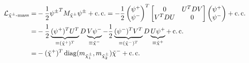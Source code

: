 \documentclass[../main.tex]{subfiles}
\begin{document}
\begin{align}
  \nonumber
  \L_{\tilde\chi^\pm\text{-mass}} = & -\frac{1}{2}{\psi^\pm}^T M_{\tilde\chi^\pm} \psi^\pm + \cc = -\frac{1}{2} \begin{pmatrix}
                                                                                                                  \psi^+ \\ \psi^-
                                                                                                                \end{pmatrix}^T \begin{bmatrix}
                                                                                                                                  0       & U^T D V \\
                                                                                                                                  V^T D U & 0
                                                                                                                                \end{bmatrix} \begin{pmatrix}
                                                                                                                                                \psi^+ \\ \psi^-
                                                                                                                                              \end{pmatrix} + \cc                                                                                                              \\
  \nonumber
  =                                 & -\frac{1}{2} \underbrace{(\psi^+)^T U^T}_{\equiv (\tilde\chi^+)^T} D \underbrace{V \psi^-}_{\equiv \tilde\chi^-} - \frac{1}{2} \underbrace{(\psi^-)^T V^T}_{\equiv (\tilde\chi^-)^T} D \underbrace{U \psi^+}_{\equiv \tilde\chi^+} + \cc \\
  =                                 & -(\tilde\chi^+)^T \operatorname{diag}(m_{\tilde\chi^\pm_1}, m_{\tilde\chi^\pm_2}) \tilde\chi^- + \cc

\end{align}
\end{document}
